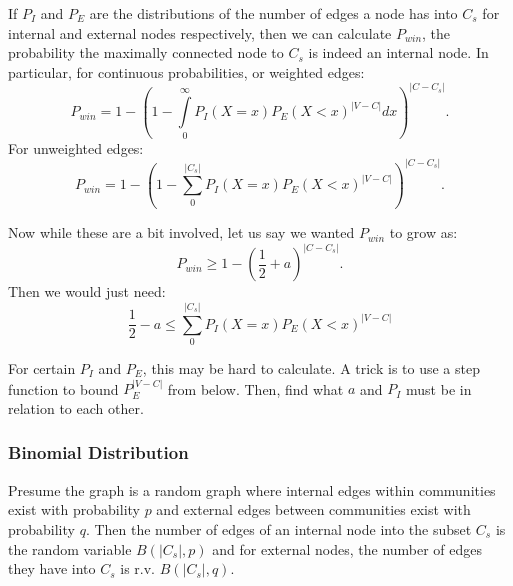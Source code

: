 \documentclass[phd,tocprelim]{cornell}
\begin{document}
If $P_I$ and $P_E$ are the distributions of the number of edges a node has into $C_s$ for internal and external nodes respectively, then we can calculate $P_{win}$, the probability the maximally connected node to $C_s$ is indeed an internal node.  In particular, for continuous probabilities, or weighted edges:
\begin{equation}
 P_{win} = 1 - \left(1 - \int\limits_{0}^{\infty} P_I(X = x) P_E(X < x)^{|V - C|}dx \right)^{|C - C_s|}.
\end{equation}
For unweighted edges:
\begin{equation}
 P_{win} = 1 - \left(1 - \sum\limits_{0}^{|C_s|} P_I(X = x) P_E(X < x)^{|V - C|} \right)^{|C - C_s|}.
\end{equation}

Now while these are a bit involved, let us say we wanted $P_{win}$ to grow as:
\begin{equation}
 P_{win} \geq 1 - \left( \frac{1}{2} + a \right)^{|C - C_s|}.
\end{equation}
Then we would just need:
\begin{equation}
\frac{1}{2} - a \leq \sum\limits_{0}^{|C_s|} P_I(X = x) P_E(X < x)^{|V - C|}
\end{equation}

For certain $P_I$ and $P_E$, this may be hard to calculate.  A trick is to use a step function to bound $P_E^{|V-C|}$ from below.  Then, find what $a$ and $P_I$ must be in relation to each other.

\subsubsection{Binomial Distribution}
Presume the graph is a random graph where internal edges within communities exist with probability $p$ and external edges between communities exist with probability $q$.  Then the number of edges of an internal node into the subset $C_s$ is the random variable $B(|C_s|, p)$ and for external nodes, the number of edges they have into $C_s$ is r.v. $B(|C_s|, q)$.
\end{document}
